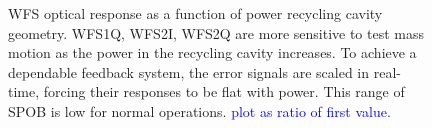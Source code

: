 \begin{figure}
\begin{centering}
\caption[Measured dependence of the WFS error signals on the power
recycling cavity geometry]{WFS optical response as a function of power
  recycling cavity geometry. WFS1Q, WFS2I, WFS2Q are more sensitive to
  test mass motion as the power in the recycling cavity increases. To
  achieve a dependable feedback system, the error signals are scaled
  in real-time, forcing their responses to be flat with power. This
  range of SPOB is low for normal operations. \textcolor{blue}{plot as
  ratio of first value.}}
\label{fig:WFStrack}
\end{centering}
\end{figure}












